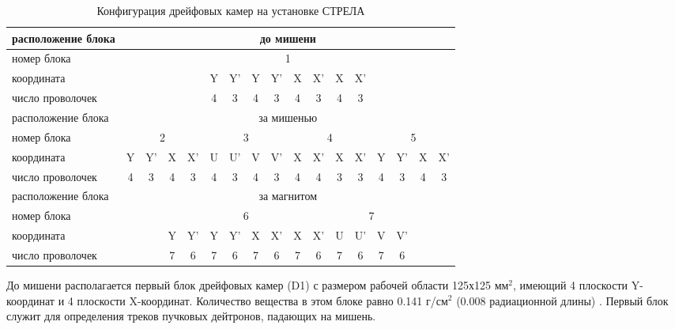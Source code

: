 \begin{table}[h]
  \begin{center}
    \resizebox{14cm}{!} {
      \begin{tabular}{|l|c|c|c|c|c|c|c|c|c|c|c|c|c|c|c|c|}
        \hline
        расположение блока & \multicolumn{16}{|c|}{до мишени} \\
        \hline
        номер блока & \multicolumn{4}{|c|}{} &
        \multicolumn{8}{|c|}{1} & \multicolumn{4}{|c|}{} \\
        координата & \multicolumn{4}{|c|}{} &
        Y & Y' & Y & Y' & X & X' & X & X' & \multicolumn{4}{|c|}{} \\
        число проволочек & \multicolumn{4}{|c|}{} &
        4 & 3 & 4 & 3 & 4 & 3 & 4 & 3 & \multicolumn{4}{|c|}{} \\
        \hline \hline

        расположение блока & \multicolumn{16}{|c|}{за мишенью} \\
        \hline
        номер блока & \multicolumn{4}{|c|}{2} & \multicolumn{4}{|c|}{3} &
        \multicolumn{4}{|c|}{4} & \multicolumn{4}{|c|}{5} \\
        координата &
        Y & Y' & X & X' & U & U' & V & V' & X & X' & X & X' & Y & Y' & X & X' \\
        число проволочек &
        4 & 3 & 4 & 3 & 4 & 3 & 4 & 3 & 4 & 4 & 3 & 3 & 4 & 3 & 4 & 3 \\
        \hline \hline

        расположение блока & \multicolumn{16}{|c|}{за магнитом} \\
        \hline
        номер блока & \multicolumn{2}{|c|}{} & \multicolumn{8}{|c|}{6} &
        \multicolumn{4}{|c|}{7} & \multicolumn{2}{|c|}{} \\
        координата & \multicolumn{2}{|c|}{} &
        Y & Y' & Y & Y' & X & X' & X & X' & U & U' & V & V' &
        \multicolumn{2}{|c|}{} \\
        число проволочек & \multicolumn{2}{|c|}{} &
        7 & 6 & 7 & 6 & 7 & 6 & 7 & 6 & 7 & 6 & 7 & 6 &
        \multicolumn{2}{|c|}{} \\
        \hline
      \end{tabular}
    }
    \caption{Конфигурация дрейфовых камер на установке СТРЕЛА}
    \label{tab:config}
  \end{center}
\end{table}

До мишени располагается первый блок дрейфовых камер (D1) с размером рабочей
области 125х125 мм$^{2}$, имеющий 4 плоскости Y-координат и 4 плоскости
X-координат. Количество вещества в этом блоке равно 0.141 г/см$^{2}$ (0.008
радиационной длины) \cite{filatova:1977}. Первый блок служит для определения
треков пучковых дейтронов, падающих на мишень.

